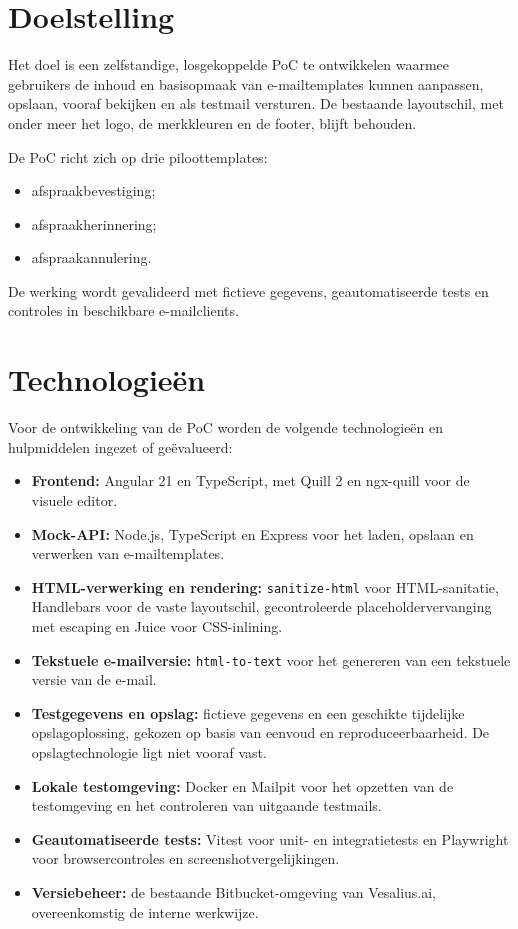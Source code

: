 \section{Doelstelling}
Het doel is een zelfstandige, losgekoppelde PoC te ontwikkelen waarmee
gebruikers de inhoud en basisopmaak van e-mailtemplates kunnen aanpassen,
opslaan, vooraf bekijken en als testmail versturen. De bestaande
layoutschil, met onder meer het logo, de merkkleuren en de footer,
blijft behouden.

De PoC richt zich op drie piloottemplates:
\begin{itemize}
    \item afspraakbevestiging;
    \item afspraakherinnering;
    \item afspraakannulering.
\end{itemize}

De werking wordt gevalideerd met fictieve gegevens, geautomatiseerde
tests en controles in beschikbare e-mailclients.

\section{Technologieën}
Voor de ontwikkeling van de PoC worden de volgende technologieën
en hulpmiddelen ingezet of geëvalueerd:

\begin{itemize}
    \item \textbf{Frontend:} Angular 21 en TypeScript, met Quill 2
    en ngx-quill voor de visuele editor.

    \item \textbf{Mock-API:} Node.js, TypeScript en Express voor het
    laden, opslaan en verwerken van e-mailtemplates.

    \item \textbf{HTML-verwerking en rendering:}
    \texttt{sanitize-html} voor HTML-sanitatie, Handlebars voor de
    vaste layoutschil, gecontroleerde placeholdervervanging met escaping
    en Juice voor CSS-inlining.

    \item \textbf{Tekstuele e-mailversie:}
    \texttt{html-to-text} voor het genereren van een tekstuele versie
    van de e-mail.

    \item \textbf{Testgegevens en opslag:} fictieve gegevens en een
    geschikte tijdelijke opslagoplossing, gekozen op basis van eenvoud
    en reproduceerbaarheid. De opslagtechnologie ligt niet vooraf vast.

    \item \textbf{Lokale testomgeving:} Docker en Mailpit voor het
    opzetten van de testomgeving en het controleren van uitgaande
    testmails.

    \item \textbf{Geautomatiseerde tests:} Vitest voor unit- en
    integratietests en Playwright voor browsercontroles en
    screenshotvergelijkingen.

    \item \textbf{Versiebeheer:} de bestaande Bitbucket-omgeving van
    Vesalius.ai, overeenkomstig de interne werkwijze.
\end{itemize}

